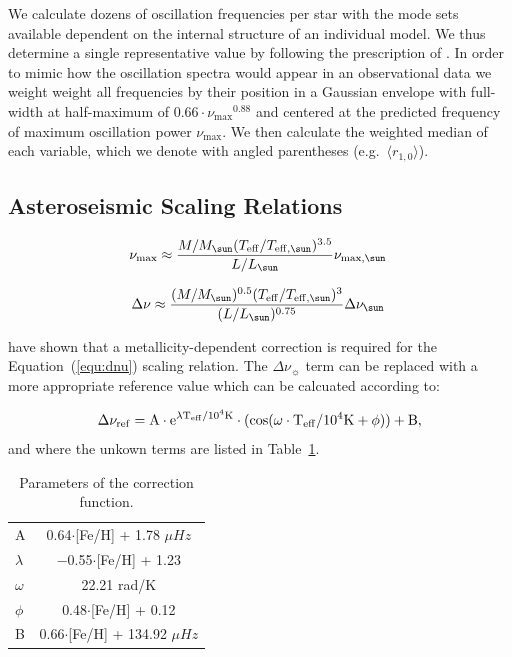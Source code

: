 We calculate dozens of oscillation frequencies per star with the mode sets available dependent on the internal structure of an individual model. We thus determine a single representative value 
by following the prescription of \citet{2012A&A...537A..30M}. In order to mimic how the oscillation spectra would appear in an observational data we weight weight all frequencies by their position in a Gaussian envelope with  full-width at half-maximum of $0.66\cdot\nu_{\max}{}^{0.88}$ and centered at the predicted frequency of maximum oscillation power $\nu_{\max}$.  We then calculate the weighted median of each variable, which we denote with angled parentheses (e.g.\ $\langle r_{1,0}\rangle$).





\subsection{Asteroseismic Scaling Relations}


\begin{equation}
\nu_{\rm max} \approx \frac{ M/M_{\sun}(T_{\rm eff}/T_{\rm eff,\sun})^{3.5}}{L/L_{\sun}} \nu_{\rm max,\sun} \: 
\label{equ:nmax}
\end{equation}

\begin{equation}
\Delta\nu \approx \frac{(M/M_{\sun})^{0.5}(T_{\rm eff}/T_{\rm eff,\sun})^{3}}{(L/L_{\sun})^{0.75}}
\Delta\nu_{\sun} \: 
\label{equ:dnu}
\end{equation}

\citet{2016MNRAS.460.4277G} have shown that a metallicity-dependent correction is required for the Equation~(\ref{equ:dnu}) scaling relation.
The $\Delta\nu_{\sun}$ term can be replaced with a more appropriate reference value which can be calcuated according to:


\begin{equation}
\Delta\nu_{\rm{ref}}=\rm{A} \cdot e^{\lambda \rm{T_{eff}}/10^4K} \cdot (\cos(\omega \cdot \rm{T_{eff}}/10^4K+\phi))+B,	
\label{eq:corrfunc2}
\end{equation}
and where the unkown terms are listed in Table~\ref{tab:pars2}. 

 
\begin{table}
	\centering
	\caption{Parameters of the correction function.}
	\label{tab:pars2}
	\begin{tabular}{lc} %
		\hline
		A & 0.64$\cdot$[Fe/H] + 1.78  $\mu Hz$ \\
		$\lambda$ & $-$0.55$\cdot$[Fe/H] + 1.23  \\
		$\omega$ & 22.21 rad/K \\
		$\phi$ & 0.48$\cdot$[Fe/H] + 0.12 \\
		B & 0.66$\cdot$[Fe/H] + 134.92 $\mu Hz$ \\
		\hline
	\end{tabular}
\end{table}




